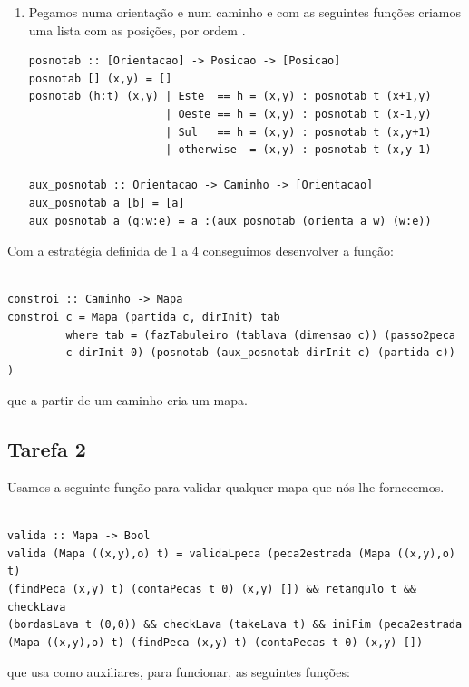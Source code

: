 \documentclass[a4paper]{report} %
\begin{document}
\begin{enumerate}
\item Pegamos numa orientação e num caminho e com as seguintes funções criamos uma lista com as posições, por ordem .
\begin{verbatim}
posnotab :: [Orientacao] -> Posicao -> [Posicao]
posnotab [] (x,y) = []
posnotab (h:t) (x,y) | Este  == h = (x,y) : posnotab t (x+1,y)
                     | Oeste == h = (x,y) : posnotab t (x-1,y)
                     | Sul   == h = (x,y) : posnotab t (x,y+1)
                     | otherwise  = (x,y) : posnotab t (x,y-1)

aux_posnotab :: Orientacao -> Caminho -> [Orientacao]
aux_posnotab a [b] = [a]
aux_posnotab a (q:w:e) = a :(aux_posnotab (orienta a w) (w:e))
\end{verbatim}

\end{enumerate}

Com a estratégia definida de 1 a 4 conseguimos desenvolver a função:

\begin{verbatim}

constroi :: Caminho -> Mapa
constroi c = Mapa (partida c, dirInit) tab
         where tab = (fazTabuleiro (tablava (dimensao c)) (passo2peca 
         c dirInit 0) (posnotab (aux_posnotab dirInit c) (partida c)) ) 
\end{verbatim}
que a partir de um caminho cria um mapa.


\subsection{Tarefa 2}
\label{subsec:solucaotarefa2}

Usamos a seguinte função para validar qualquer mapa que nós lhe fornecemos.
\begin{verbatim}

valida :: Mapa -> Bool
valida (Mapa ((x,y),o) t) = validaLpeca (peca2estrada (Mapa ((x,y),o) t) 
(findPeca (x,y) t) (contaPecas t 0) (x,y) []) && retangulo t && checkLava 
(bordasLava t (0,0)) && checkLava (takeLava t) && iniFim (peca2estrada 
(Mapa ((x,y),o) t) (findPeca (x,y) t) (contaPecas t 0) (x,y) [])

\end{verbatim}
que usa como auxiliares, para funcionar, as seguintes funções:
\end{document}
